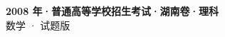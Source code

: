 \documentclass[zihao=-4, a4paper]{ctexart}
\begin{document}
\begin{center}
  {\Large\bfseries 2008 年·普通高等学校招生考试·湖南卷·理科}\\[4pt]
  {\large 数学 · 试题版}
\end{center}
\medskip
{}

\end{document}
